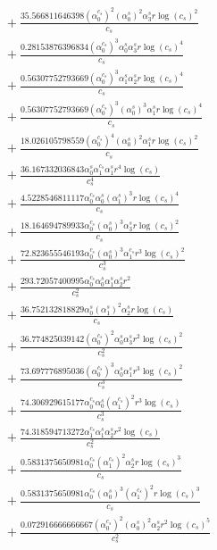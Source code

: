 \documentclass[10pt]{article}
\begin{document}
\begin{align*}
&{}  + \frac{35.566811646398 \left(\alpha_{0}^{c_s}\right)^{2} \left(\alpha_{0}^s\right)^{2} \alpha_{3}^s r \log{\left(c_{s} \right)}^{2}}{c_{s}} \\
&{}  + \frac{0.28153876396834 \left(\alpha_{0}^{c_s}\right)^{3} \alpha_{0}^s \alpha_{3}^s r \log{\left(c_{s} \right)}^{4}}{c_{s}} \\
&{}  + \frac{0.56307752793669 \left(\alpha_{0}^{c_s}\right)^{3} \alpha_{1}^s \alpha_{2}^s r \log{\left(c_{s} \right)}^{4}}{c_{s}} \\
&{}  + \frac{0.56307752793669 \left(\alpha_{0}^{c_s}\right)^{3} \left(\alpha_{0}^s\right)^{3} \alpha_{1}^s r \log{\left(c_{s} \right)}^{4}}{c_{s}} \\
&{}  + \frac{18.026105798559 \left(\alpha_{0}^{c_s}\right)^{4} \left(\alpha_{0}^s\right)^{2} \alpha_{1}^s r \log{\left(c_{s} \right)}^{2}}{c_{s}} \\
&{}  + \frac{36.167332036843 \alpha_{0}^s \alpha_{1}^{c_s} \alpha_{1}^s r^{4} \log{\left(c_{s} \right)}}{c_{s}^{4}} \\
&{}  + \frac{4.5228546811117 \alpha_{0}^{c_s} \alpha_{0}^s \left(\alpha_{1}^s\right)^{3} r \log{\left(c_{s} \right)}^{4}}{c_{s}} \\
&{}  + \frac{18.164694789933 \alpha_{0}^{c_s} \left(\alpha_{0}^s\right)^{3} \alpha_{3}^s r \log{\left(c_{s} \right)}^{2}}{c_{s}} \\
&{}  + \frac{72.823655546193 \alpha_{0}^{c_s} \left(\alpha_{0}^s\right)^{3} \alpha_{1}^{c_s} r^{3} \log{\left(c_{s} \right)}^{2}}{c_{s}^{3}} \\
&{}  + \frac{293.72057400995 \alpha_{0}^{c_s} \alpha_{0}^s \alpha_{1}^s \alpha_{2}^s r^{2}}{c_{s}^{2}} \\
&{}  + \frac{36.752132818829 \alpha_{0}^s \left(\alpha_{1}^s\right)^{2} \alpha_{2}^s r \log{\left(c_{s} \right)}}{c_{s}} \\
&{}  + \frac{36.774825039142 \left(\alpha_{0}^{c_s}\right)^{2} \alpha_{0}^s \alpha_{3}^s r^{2} \log{\left(c_{s} \right)}^{2}}{c_{s}^{2}} \\
&{}  + \frac{73.697776895036 \left(\alpha_{0}^{c_s}\right)^{3} \alpha_{0}^s \alpha_{1}^s r^{3} \log{\left(c_{s} \right)}^{2}}{c_{s}^{3}} \\
&{}  + \frac{74.306929615177 \alpha_{0}^{c_s} \alpha_{0}^s \left(\alpha_{1}^{c_s}\right)^{2} r^{3} \log{\left(c_{s} \right)}}{c_{s}^{3}} \\
&{}  + \frac{74.318594713272 \alpha_{1}^{c_s} \alpha_{1}^s \alpha_{2}^s r^{2} \log{\left(c_{s} \right)}}{c_{s}^{2}} \\
&{}  + \frac{0.5831375650981 \alpha_{0}^{c_s} \left(\alpha_{1}^{c_s}\right)^{2} \alpha_{2}^s r \log{\left(c_{s} \right)}^{3}}{c_{s}} \\
&{}  + \frac{0.5831375650981 \alpha_{0}^{c_s} \left(\alpha_{0}^s\right)^{3} \left(\alpha_{1}^{c_s}\right)^{2} r \log{\left(c_{s} \right)}^{3}}{c_{s}} \\
&{}  + \frac{0.072916666666667 \left(\alpha_{0}^{c_s}\right)^{2} \left(\alpha_{0}^s\right)^{2} \alpha_{2}^s r^{2} \log{\left(c_{s} \right)}^{5}}{c_{s}^{2}}
\end{align*}
\end{document}
